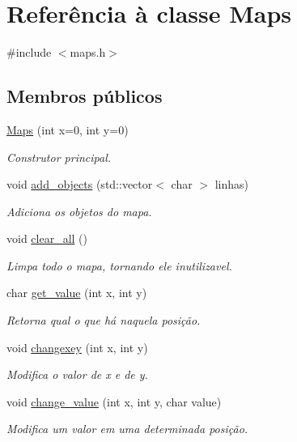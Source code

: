 \hypertarget{classMaps}{}\section{Referência à classe Maps}
\label{classMaps}


{\ttfamily \#include $<$maps.\+h$>$}

\subsection*{Membros públicos}
\begin{DoxyCompactItemize}
\item 
\hyperlink{classMaps_ab6b20c54c22fc74b5e1d72fb245047b4}{Maps} (int x=0, int y=0)
\begin{DoxyCompactList}\small\item\em Construtor principal. \end{DoxyCompactList}\item 
void \hyperlink{classMaps_aea314b57c9d092f2a40eed4f3e2fa196}{add\+\_\+objects} (std\+::vector$<$ char $>$ linhas)
\begin{DoxyCompactList}\small\item\em Adiciona os objetos do mapa. \end{DoxyCompactList}\item 
void \hyperlink{classMaps_a0a7f0ddaeb883334dfa9a16bfc0b3356}{clear\+\_\+all} ()
\begin{DoxyCompactList}\small\item\em Limpa todo o mapa, tornando ele inutilizavel. \end{DoxyCompactList}\item 
char \hyperlink{classMaps_a7217b2b2818eb73c1cf5505f3837d665}{get\+\_\+value} (int x, int y)
\begin{DoxyCompactList}\small\item\em Retorna qual o que há naquela posição. \end{DoxyCompactList}\item 
void \hyperlink{classMaps_af3d935925e955f25aa02659b6c670245}{changexey} (int x, int y)
\begin{DoxyCompactList}\small\item\em Modifica o valor de x e de y. \end{DoxyCompactList}\item 
void \hyperlink{classMaps_a511070b444b7e3ab8afc5b22d77d3290}{change\+\_\+value} (int x, int y, char value)
\begin{DoxyCompactList}\small\item\em Modifica um valor em uma determinada posição. \end{DoxyCompactList}\item 

\end{DoxyCompactItemize}
